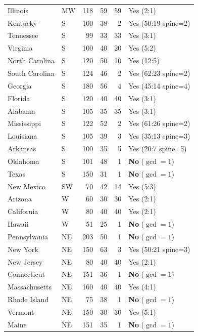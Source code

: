 \begin{table}[h]
\begin{tabular}{llrrrl}
Illinois      & MW   & 118 & 59  & 59  & Yes (2:1) \\
Kentucky      & S    & 100 & 38  & 2   & Yes (50:19 spine=2) \\
Tennessee     & S    & 99  & 33  & 33  & Yes (3:1) \\
Virginia      & S    & 100 & 40  & 20  & Yes (5:2) \\
North Carolina & S   & 120 & 50  & 10  & Yes (12:5) \\
South Carolina & S   & 124 & 46  & 2   & Yes (62:23 spine=2) \\
Georgia       & S    & 180 & 56  & 4   & Yes (45:14 spine=4) \\
Florida       & S    & 120 & 40  & 40  & Yes (3:1) \\
Alabama       & S    & 105 & 35  & 35  & Yes (3:1) \\
Mississippi   & S    & 122 & 52  & 2   & Yes (61:26 spine=2) \\
Louisiana     & S    & 105 & 39  & 3   & Yes (35:13 spine=3) \\
Arkansas      & S    & 100 & 35  & 5   & Yes (20:7 spine=5) \\
Oklahoma      & S    & 101 & 48  & 1   & \textbf{No} ($\gcd=1$) \\
Texas         & S    & 150 & 31  & 1   & \textbf{No} ($\gcd=1$) \\
New Mexico    & SW   & 70  & 42  & 14  & Yes (5:3) \\
Arizona       & W    & 60  & 30  & 30  & Yes (2:1) \\
California    & W    & 80  & 40  & 40  & Yes (2:1) \\
Hawaii        & W    & 51  & 25  & 1   & \textbf{No} ($\gcd=1$) \\
Pennsylvania  & NE   & 203 & 50  & 1   & \textbf{No} ($\gcd=1$) \\
New York      & NE   & 150 & 63  & 3   & Yes (50:21 spine=3) \\
New Jersey    & NE   & 80  & 40  & 40  & Yes (2:1) \\
Connecticut   & NE   & 151 & 36  & 1   & \textbf{No} ($\gcd=1$) \\
Massachusetts & NE   & 160 & 40  & 40  & Yes (4:1) \\
Rhode Island  & NE   & 75  & 38  & 1   & \textbf{No} ($\gcd=1$) \\
Vermont       & NE   & 150 & 30  & 30  & Yes (5:1) \\
Maine         & NE   & 151 & 35  & 1   & \textbf{No} ($\gcd=1$) \\

\end{tabular}
\end{table}
